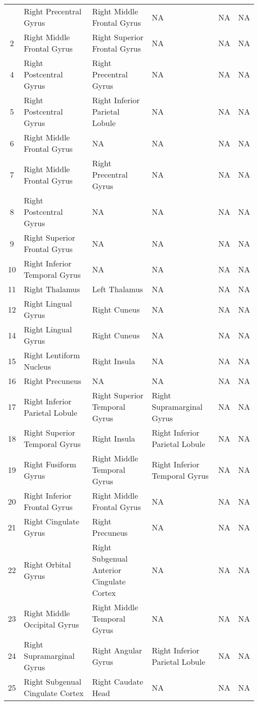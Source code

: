 \documentclass[10pt,letterpaper]{article}\usepackage[]{graphicx}\usepackage[]{color}
\begin{document}
\begin{center}
\begin{longtable}[c]{cP{1.1in}P{1.1in}P{1.1in}P{1.1in}P{1.1in}}
		\bottomrule
		 & Right Precentral Gyrus & Right Middle Frontal Gyrus	& NA & NA & NA \\
		2 & Right Middle Frontal Gyrus & Right Superior Frontal Gyrus & NA & NA & NA \\
		4 & Right Postcentral Gyrus	& Right Precentral Gyrus & NA & NA & NA \\
		5 & Right Postcentral Gyrus	& Right Inferior Parietal Lobule & NA & NA & NA \\
		6 & Right Middle Frontal Gyrus & NA & NA & NA & NA \\
		7 & Right Middle Frontal Gyrus & Right Precentral Gyrus & NA & NA & NA \\
		8 & Right Postcentral Gyrus	& NA & NA & NA & NA \\
		9 & Right Superior Frontal Gyrus & NA & NA & NA & NA \\
		10 & Right Inferior Temporal Gyrus & NA	& NA & NA & NA \\
		11 & Right Thalamus	& Left Thalamus & NA & NA	& NA \\
		12 & Right Lingual Gyrus & Right Cuneus	& NA & NA & NA \\
		14 & Right Lingual Gyrus & Right Cuneus	& NA & NA & NA \\
		15 & Right Lentiform Nucleus & Right Insula & NA & NA & NA \\
		16 & Right Precuneus & NA & NA & NA	& NA \\
		17 & Right Inferior Parietal Lobule & Right Superior Temporal Gyrus & Right Supramarginal Gyrus	& NA & NA \\
		18 & Right Superior Temporal Gyrus & Right Insula &	Right Inferior Parietal Lobule & NA	& NA \\
		19 & Right Fusiform Gyrus & Right Middle Temporal Gyrus & Right Inferior Temporal Gyrus & NA & NA \\
		20 & Right Inferior Frontal Gyrus & Right Middle Frontal Gyrus & NA	& NA & NA \\
		21 & Right Cingulate Gyrus & Right Precuneus & NA & NA & NA \\
		22 & Right Orbital Gyrus & Right Subgenual Anterior Cingulate Cortex & NA & NA & NA \\
		23 & Right Middle Occipital Gyrus & Right Middle Temporal Gyrus & NA & NA & NA \\
		24 & Right Supramarginal Gyrus & Right Angular Gyrus & Right Inferior Parietal Lobule & NA & NA \\
		25 & Right Subgenual Cingulate Cortex & Right Caudate Head & NA & NA & NA \\

\end{longtable}
\end{center}
\end{document}

